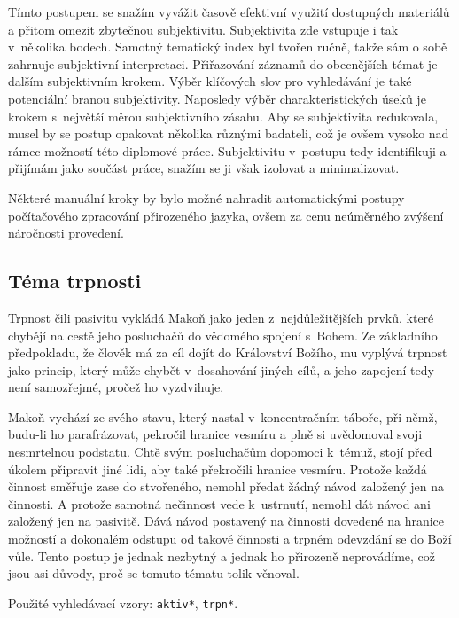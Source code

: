 Tímto postupem se snažím vyvážit časově efektivní využití dostupných materiálů a
přitom omezit zbytečnou subjektivitu. Subjektivita zde vstupuje i tak v~několika
bodech. Samotný tematický index byl tvořen ručně, takže sám o sobě zahrnuje
subjektivní interpretaci. Přiřazování záznamů do obecnějších témat je dalším
subjektivním krokem. Výběr klíčových slov pro vyhledávání je také potenciální
branou subjektivity. Naposledy výběr charakteristických úseků je krokem
s~největší měrou subjektivního zásahu. Aby se subjektivita redukovala, musel by
se postup opakovat několika různými badateli, což je ovšem vysoko nad rámec
možností této diplomové práce. Subjektivitu v~postupu tedy identifikuji a
přijímám jako součást práce, snažím se ji však izolovat a minimalizovat.

Některé manuální kroky by bylo možné nahradit automatickými postupy počítačového
zpracování přirozeného jazyka, ovšem za cenu neúměrného zvýšení náročnosti
provedení.

\subsection{Téma trpnosti}

Trpnost čili pasivitu vykládá Makoň jako jeden z~nejdůležitějších prvků, které
chybějí na cestě jeho posluchačů do vědomého spojení s~Bohem. Ze základního
předpokladu, že člověk má za cíl dojít do Království Božího, mu vyplývá trpnost
jako princip, který může chybět v~dosahování jiných cílů, a jeho zapojení tedy
není samozřejmé, pročež ho vyzdvihuje.

Makoň vychází ze svého stavu, který nastal v~koncentračním táboře, při němž,
budu-li ho parafrázovat, pekročil hranice vesmíru a plně si uvědomoval svoji
nesmrtelnou podstatu. Chtě svým posluchačům dopomoci k~témuž, stojí před
úkolem připravit jiné lidi, aby také překročili hranice vesmíru. Protože každá
činnost směřuje zase do stvořeného, nemohl předat žádný návod založený jen na
činnosti. A protože samotná nečinnost vede k~ustrnutí, nemohl dát návod ani
založený jen na pasivitě. Dává návod postavený na činnosti dovedené na hranice
možností a dokonalém odstupu od takové činnosti a trpném odevzdání se do Boží
vůle. Tento postup je jednak nezbytný a jednak ho přirozeně neprovádíme, což
jsou asi důvody, proč se tomuto tématu tolik věnoval.

Použité vyhledávací vzory: \texttt{aktiv*}, \texttt{trpn*}.

